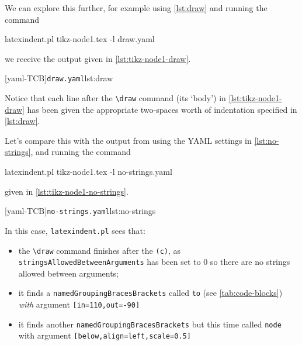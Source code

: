 \documentclass[10pt]{article}
\begin{document}
 \begin{example}
 We can explore this further, for example using \cref{lst:draw} and running the command

 \begin{commandshell}
latexindent.pl tikz-node1.tex -l draw.yaml  
\end{commandshell}

 we receive the output given in \cref{lst:tikz-node1-draw}.

 \begin{cmhtcbraster}[raster column skip=.1\linewidth]
  [yaml-TCB]{\texttt{draw.yaml}}{lst:draw}
 \end{cmhtcbraster}

 Notice that each line after the \lstinline!\draw! command (its `body') in
 \cref{lst:tikz-node1-draw} has been given the appropriate two-spaces worth of
 indentation specified in \cref{lst:draw}.

 Let's compare this with the output from using the YAML settings in
 \cref{lst:no-strings}, and running the command 

 \begin{commandshell}
latexindent.pl tikz-node1.tex -l no-strings.yaml  
\end{commandshell}

 given in \cref{lst:tikz-node1-no-strings}.

 \begin{cmhtcbraster}[raster column skip=.1\linewidth]
  [yaml-TCB]{\texttt{no-strings.yaml}}{lst:no-strings}
 \end{cmhtcbraster}

 In this case, \texttt{latexindent.pl} sees that:
 \begin{itemize}
  \item the \lstinline!\draw! command finishes after the \lstinline!(c)!, as
        \texttt{stringsAllowedBetweenArguments} has been set to $0$ so there are no
        strings allowed between arguments;
  \item it finds a \texttt{namedGroupingBracesBrackets} called \texttt{to} (see
        \vref{tab:code-blocks}) \emph{with} argument \lstinline![in=110,out=-90]!
  \item it finds another \texttt{namedGroupingBracesBrackets} but this time called
        \texttt{node} with argument \lstinline![below,align=left,scale=0.5]!
 \end{itemize}
 \end{example}
\end{document}
